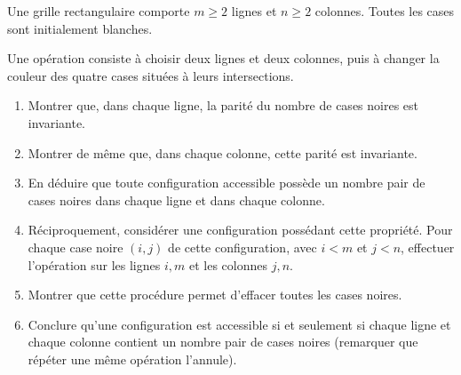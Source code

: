 Une grille rectangulaire comporte $m \geq 2$ lignes et $n \geq 2$ colonnes. Toutes les
cases sont initialement blanches.

Une opération consiste à choisir deux lignes et deux colonnes, puis à changer
la couleur des quatre cases situées à leurs intersections.
\begin{enumerate}
  \item Montrer que, dans chaque ligne, la parité du nombre de cases noires
  est invariante.
  \item Montrer de même que, dans chaque colonne, cette parité est invariante.
  \item En déduire que toute configuration accessible possède un nombre pair
  de cases noires dans chaque ligne et dans chaque colonne.
  \item Réciproquement, considérer une configuration possédant cette
  propriété. Pour chaque case noire $(i, j)$ de cette configuration, avec $i < m$ et $j < n$,
  effectuer l'opération sur les lignes $i, m$ et les colonnes $j, n$.
  \item Montrer que cette procédure permet d'effacer toutes les cases noires.
  \item Conclure qu'une configuration est accessible si et seulement si chaque
  ligne et chaque colonne contient un nombre pair de cases noires (remarquer que répéter une même
  opération l'annule).
\end{enumerate}
